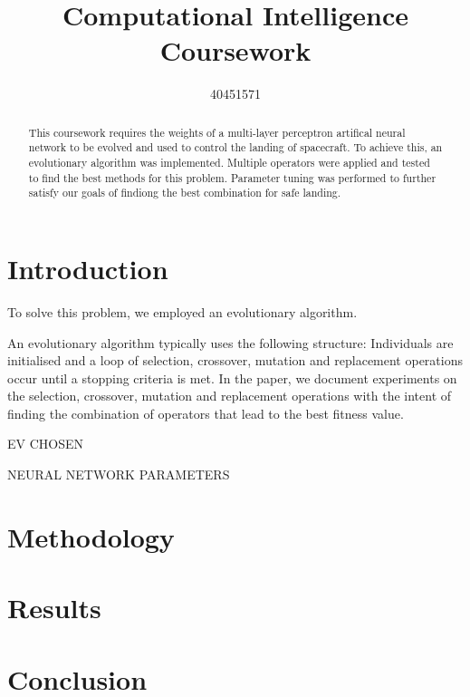 \documentclass[sigconf]{acmart}
\begin{document}
\title{Computational Intelligence Coursework}

\author{40451571}



\begin{abstract}This coursework requires the weights of a multi-layer perceptron artifical neural network to be evolved and used to control the landing of spacecraft. To achieve this, an evolutionary algorithm was implemented. Multiple operators were applied and tested to find the best methods for this problem. Parameter tuning was performed to further satisfy our goals of findiong the best combination for safe landing.
\end{abstract}





\maketitle

\section{Introduction}
To solve this problem, we employed an evolutionary algorithm. 
\cite{Tesla}

An evolutionary algorithm typically uses the following structure: Individuals are initialised and a loop of selection, crossover, mutation and replacement operations occur until a stopping criteria is met. In the paper, we document experiments on the selection, crossover, mutation and replacement operations with the intent of finding the combination of operators that lead to the best fitness value.

EV CHOSEN

NEURAL NETWORK PARAMETERS
\section{Methodology}
\section{Results}
\section{Conclusion}



 
\end{document}
